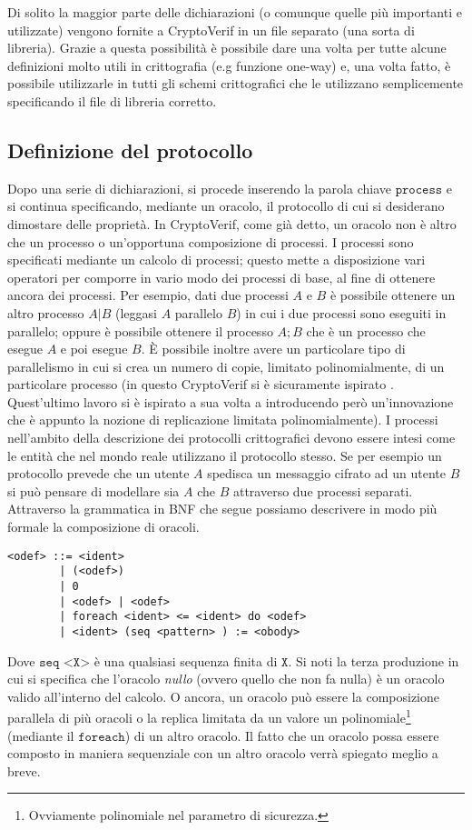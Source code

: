 \documentclass[a4paper,openright,twoside,12pt]{report}
\begin{document}
Di solito la maggior parte delle dichiarazioni (o comunque quelle pi\`u importanti e utilizzate) vengono fornite a CryptoVerif in un file separato (una sorta di libreria). 
Grazie a questa possibilit\`a \`e possibile dare una volta per tutte alcune definizioni molto utili in crittografia (e.g funzione one-way) e, 
una volta fatto, \`e possibile utilizzarle in tutti gli schemi crittografici che le utilizzano semplicemente specificando il file di libreria corretto.
\subsection{Definizione del protocollo}
Dopo una serie di dichiarazioni, si procede inserendo la parola chiave $\texttt{process}$ e si continua specificando, mediante un oracolo, il protocollo di cui si desiderano dimostare delle propriet\`a. 
In CryptoVerif, come gi\`a detto, un oracolo non \`e altro che un processo o un'opportuna composizione di processi. 
I processi sono specificati mediante un calcolo di processi; questo mette a disposizione vari operatori per comporre in vario modo dei processi di base, al fine di ottenere
ancora dei processi. Per esempio, dati due processi $A$ e $B$ \`e possibile ottenere un altro processo $A|B$ (leggasi $A$ parallelo $B$) in cui i due processi
sono eseguiti in parallelo; oppure \`e possibile ottenere il processo $A;B$ che \`e un processo che esegue $A$ e poi esegue $B$. \`E possibile inoltre avere
un particolare tipo di parallelismo in cui si crea un numero di copie, limitato polinomialmente, di un particolare processo (in questo CryptoVerif
si \`e sicuramente ispirato \cite{MitchellRST06}. Quest'ultimo lavoro si \`e ispirato a sua volta
a \cite{AbadiG99} introducendo per\`o un'innovazione che \`e appunto la nozione di replicazione limitata polinomialmente). I processi nell'ambito della descrizione dei protocolli crittografici
devono essere intesi come le entit\`a che nel mondo reale utilizzano il protocollo stesso. Se per esempio un protocollo prevede che un utente $A$ spedisca un messaggio cifrato ad un 
utente $B$ si pu\`o pensare di modellare sia $A$ che $B$ attraverso due processi separati. Attraverso la grammatica in BNF che segue possiamo descrivere in modo pi\`u formale 
la composizione di oracoli.\\
\begin{verbatim}
<odef> ::= <ident>
        | (<odef>)
        | 0
        | <odef> | <odef>
        | foreach <ident> <= <ident> do <odef>
        | <ident> (seq <pattern> ) := <obody>
\end{verbatim} 
Dove $\texttt{seq <X>}$ \`e una qualsiasi sequenza finita di $\texttt{X}$.
Si noti la terza produzione in cui si specifica che l'oracolo \emph{nullo} (ovvero quello che non fa nulla) \`e un oracolo valido all'interno del calcolo. O ancora, un oracolo pu\`o essere la composizione parallela di
pi\`u oracoli o la replica limitata da un valore un polinomiale\footnote{Ovviamente polinomiale nel parametro di sicurezza.} (mediante il $\texttt{foreach}$) di un altro oracolo. Il fatto che un oracolo possa essere composto in maniera sequenziale con un altro oracolo
verr\`a spiegato meglio a breve.
\end{document}
